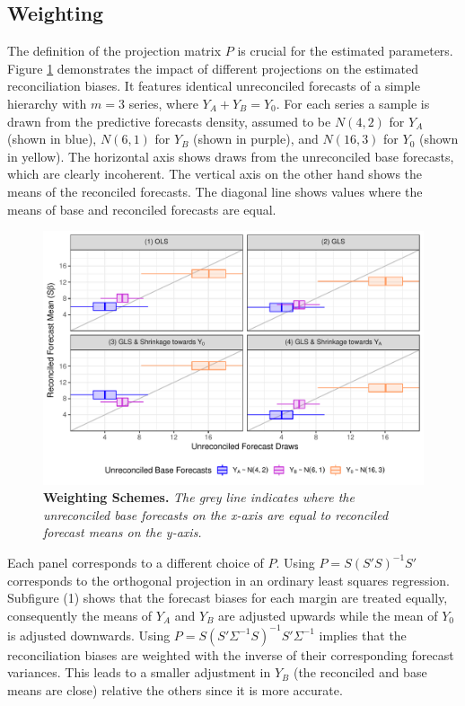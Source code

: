 \documentclass[a4paper,fleqn,11pt]{article}
\begin{document}
\subsection{Weighting}
\label{sec:weighting}
The definition of the projection matrix $P$ is crucial for the estimated parameters. Figure \ref{fig:weights} demonstrates the impact of different projections on the estimated reconciliation biases. It features identical unreconciled forecasts of a simple hierarchy with $m=3$ series, where $Y_A + Y_B = Y_0$. For each series a sample is drawn from the predictive forecasts density, assumed to be $N(4,2)$ for $Y_A$ (shown in blue), $N(6,1)$ for $Y_B$ (shown in purple), and $N(16,3)$ for $Y_0$ (shown in yellow). The horizontal axis shows draws from the unreconciled base forecasts, which are clearly incoherent. The vertical axis on the other hand shows the means of the reconciled forecasts. The diagonal line shows values where the means of base and reconciled forecasts are equal.
\begin{figure}[H]
	\includegraphics[width=\textwidth]{fig/fig_biases}
	\caption[Weighting Schemes]{\textbf{Weighting Schemes.} \textit{The grey line indicates where the unreconciled base forecasts on the x-axis are equal to reconciled forecast means on the y-axis.}}\label{fig:weights}
\end{figure}
Each panel corresponds to a different choice of $P$. Using $P = S(S'S)^{-1}S'$ corresponds to the orthogonal projection in an ordinary least squares regression. Subfigure (1) shows that the forecast biases for each margin are treated equally, consequently the means of $Y_A$ and $Y_B$ are adjusted upwards while the mean of $Y_0$ is adjusted downwards. Using $P = S(S'\Sigma^{-1}S)^{-1}S'\Sigma^{-1}$ implies that the reconciliation biases are weighted with the inverse of their corresponding forecast variances. This leads to a smaller adjustment in $Y_B$ (the reconciled and base means are close) relative the others since it is more accurate.\\
\end{document}
